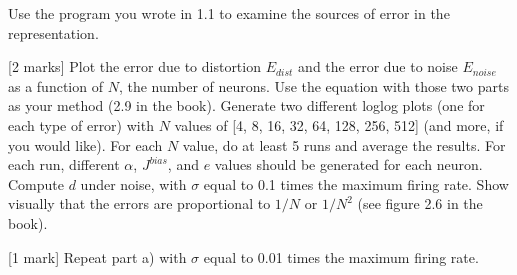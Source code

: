 \documentclass{article}
\begin{document}
Use the program you wrote in 1.1 to examine the sources of error in the
representation.

    {[}2 marks{]} Plot the error due to distortion $E_{dist}$ and the error
due to noise $E_{noise}$ as a function of $N$, the number of neurons.
Use the equation with those two parts as your method (2.9 in the book).
Generate two different loglog plots (one for each type of error) with
$N$ values of {[}4, 8, 16, 32, 64, 128, 256, 512{]} (and more, if you
would like). For each $N$ value, do at least 5 runs and average the
results. For each run, different $\alpha$, $J^{bias}$, and $e$ values
should be generated for each neuron. Compute $d$ under noise, with
$\sigma$ equal to 0.1 times the maximum firing rate. Show visually that
the errors are proportional to $1/N$ or $1/N^2$ (see figure 2.6 in the
book).

{[}1 mark{]} Repeat part a) with $\sigma$ equal to 0.01 times the
maximum firing rate.
\end{document}
